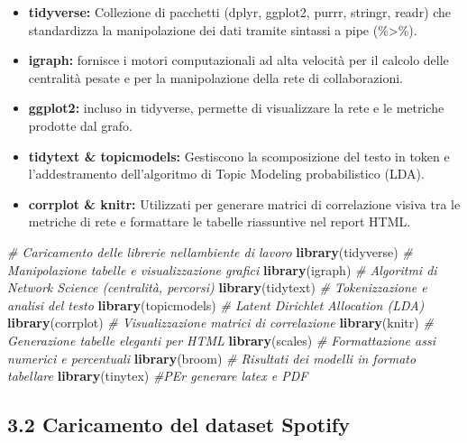 \documentclass[
]{article}
\newenvironment{Shaded}{\begin{snugshade}}{\end{snugshade}}
\newcommand{\CommentTok}[1]{\textcolor[rgb]{0.56,0.35,0.01}{\textit{#1}}}
\newcommand{\FunctionTok}[1]{\textcolor[rgb]{0.13,0.29,0.53}{\textbf{#1}}}
\newcommand{\NormalTok}[1]{#1}
\begin{document}
\begin{itemize}
\item
  \textbf{tidyverse:} Collezione di pacchetti (dplyr, ggplot2, purrr,
  stringr, readr) che standardizza la manipolazione dei dati tramite
  sintassi a pipe (\%\textgreater\%).
\item
  \textbf{igraph:} fornisce i motori computazionali ad alta velocità per
  il calcolo delle centralità pesate e per la manipolazione della rete
  di collaborazioni.
\item
  \textbf{ggplot2:} incluso in tidyverse, permette di visualizzare la
  rete e le metriche prodotte dal grafo.
\item
  \textbf{tidytext \& topicmodels:} Gestiscono la scomposizione del
  testo in token e l'addestramento dell'algoritmo di Topic Modeling
  probabilistico (LDA).
\item
  \textbf{corrplot \& knitr:} Utilizzati per generare matrici di
  correlazione visiva tra le metriche di rete e formattare le tabelle
  riassuntive nel report HTML.
\end{itemize}

\begin{Shaded}
\begin{Highlighting}[]
\CommentTok{\# Caricamento delle librerie nell\textquotesingle{}ambiente di lavoro}
\FunctionTok{library}\NormalTok{(tidyverse)    }\CommentTok{\# Manipolazione tabelle e visualizzazione grafici}
\FunctionTok{library}\NormalTok{(igraph)       }\CommentTok{\# Algoritmi di Network Science (centralità, percorsi)}
\FunctionTok{library}\NormalTok{(tidytext)     }\CommentTok{\# Tokenizzazione e analisi del testo}
\FunctionTok{library}\NormalTok{(topicmodels)  }\CommentTok{\# Latent Dirichlet Allocation (LDA)}
\FunctionTok{library}\NormalTok{(corrplot)     }\CommentTok{\# Visualizzazione matrici di correlazione}
\FunctionTok{library}\NormalTok{(knitr)        }\CommentTok{\# Generazione tabelle eleganti per HTML}
\FunctionTok{library}\NormalTok{(scales)       }\CommentTok{\# Formattazione assi numerici e percentuali}
\FunctionTok{library}\NormalTok{(broom)        }\CommentTok{\# Risultati dei modelli in formato tabellare}
\FunctionTok{library}\NormalTok{(tinytex)      }\CommentTok{\#PEr generare latex e PDF}
\end{Highlighting}
\end{Shaded}

\subsection{3.2 Caricamento del dataset
Spotify}\label{caricamento-del-dataset-spotify}
\end{document}
